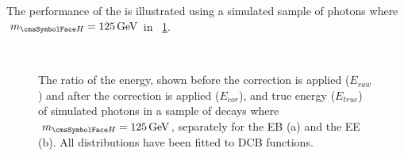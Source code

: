 The performance of the \PhoEnergyBdt is illustrated using a simulated sample of \Hgg photons where $\mH=125\GeV$ in \Fig~\ref{fig:reco:pho_regression}.

\begin{figure}[h]
\centering
  \\
\caption{The ratio of the \SC energy, shown before the \PhoEnergyBdt correction is applied ($E_{raw}$) and after the correction is applied ($E_{cor}$), and true energy ($E_{true}$) of simulated photons in a sample of \Hgg decays where $\mH=125\GeV$, separately for the EB (a) and the EE (b). All distributions have been fitted to DCB functions.}

\label{fig:reco:pho_regression}
\end{figure}


